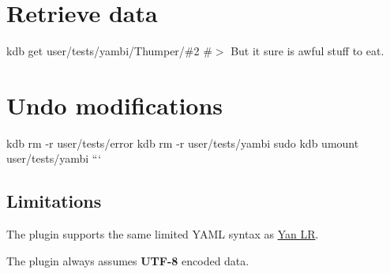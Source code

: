 \section*{Retrieve data}

kdb get user/tests/yambi/\+Thumper/\#2 \#$>$ But it sure is awful stuff to eat.

\section*{Undo modifications}

kdb rm -\/r user/tests/error kdb rm -\/r user/tests/yambi sudo kdb umount user/tests/yambi ```

\subsection*{Limitations}

The plugin supports the same limited Y\+A\+ML syntax as \hyperlink{md_src_plugins_yanlr_README_src_plugins_yanlr_README_md}{Yan LR}.


\begin{DoxyItemize}
\item The plugin always assumes {\bfseries U\+T\+F-\/8} encoded data. 
\end{DoxyItemize}